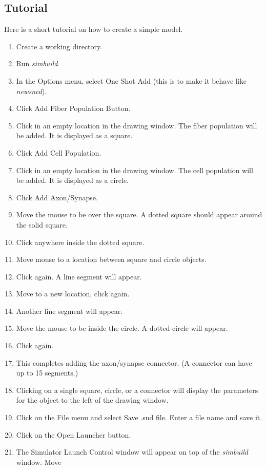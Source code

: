 \documentclass[12pt,openany,oneside]{book}
\newcommand{\prog}[1]{\textit{{#1}}}
\begin{document}
\subsection{Tutorial}
Here is a short tutorial on how to create a simple model.
\begin{enumerate}
   \item Create a working directory.
   \item Run \prog{simbuild}.
   \item In the Options menu, select One Shot Add (this is to make it behave like \prog{newsned}).
   \item Click Add Fiber Population Button.
   \item Click in an empty location in the drawing window. The fiber population will be added. It is displayed as a square.
   \item Click Add Cell Population.
   \item Click in an empty location in the drawing window. The cell population will be added. It is displayed as a circle.
   \item Click Add Axon/Synapse.
   \item Move the mouse to be over the square. A dotted square should appear around the solid square.
   \item Click anywhere inside the dotted square.
   \item Move mouse to a location between square and circle objects.
   \item Click again. A line segment will appear.
   \item Move to a new location, click again.
   \item Another line segment will appear.
   \item Move the mouse to be inside the circle. A dotted circle will appear.
   \item Click again.
   \item This completes adding the axon/synapse connector. (A connector can have up to 15 segments.)
   \item Clicking on a single square, circle, or a connector will display
      the parameters for the object to the left of the drawing window.
   \item Click on the File menu and select Save .snd file. Enter a file name and save it.
   \item Click on the Open Launcher button.
   \item The Simulator Launch Control window will appear on top of the \prog{simbuild} window. Move

\end{enumerate}
\end{document}
